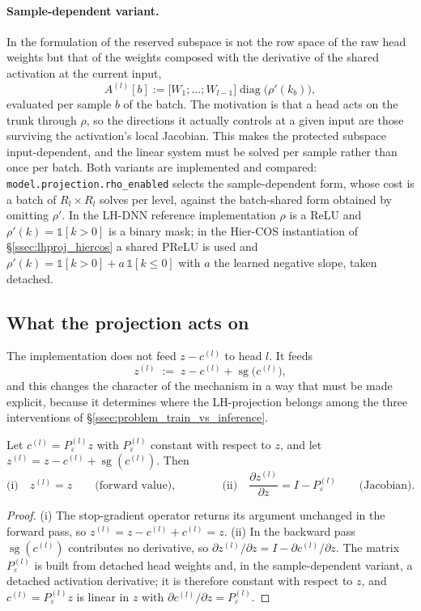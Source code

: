 \paragraph{Sample-dependent variant.} In the formulation of
\cite{fiaschi2024informed} the reserved subspace is not the row space of the raw
head weights but that of the weights composed with the derivative of the shared
activation at the current input,
\[
A^{(l)}[b]:=\big[W_1;\dots;W_{l-1}\big]\operatorname{diag}\!\big(\rho'(k_b)\big),
\]
evaluated per sample $b$ of the batch. The motivation is that a head acts on the
trunk through $\rho$, so the directions it actually controls at a given input are
those surviving the activation's local Jacobian. This makes the protected subspace
input-dependent, and the linear system must be solved per sample rather than once
per batch. Both variants are implemented and compared:
\texttt{model.projection.rho\_enabled} selects the sample-dependent form, whose
cost is a batch of $R_l\times R_l$ solves per level, against the batch-shared form
obtained by omitting $\rho'$. In the LH-DNN reference implementation $\rho$ is a
ReLU and $\rho'(k)=\mathbb{1}[k>0]$ is a binary mask; in the Hier-COS
instantiation of \S\ref{ssec:lhproj_hiercos} a shared PReLU is used and
$\rho'(k)=\mathbb{1}[k>0]+a\,\mathbb{1}[k\le 0]$ with $a$ the learned negative
slope, taken detached.

\subsection{What the projection acts on}
\label{ssec:lhproj_forward}

The implementation does not feed $z-c^{(l)}$ to head $l$. It feeds
\[
z^{(l)} \;:=\; z-c^{(l)}+\operatorname{sg}\big(c^{(l)}\big),
\]
and this changes the character of the mechanism in a way that must be made
explicit, because it determines where the LH-projection belongs among the three
interventions of \S\ref{ssec:problem_train_vs_inference}.

\begin{proposition}
\label{prop:lhproj_forward}
Let $c^{(l)}=P^{(l)}_\varepsilon z$ with $P^{(l)}_\varepsilon$ constant with
respect to $z$, and let
$z^{(l)}=z-c^{(l)}+\operatorname{sg}(c^{(l)})$. Then
\[
\text{(i)}\quad z^{(l)}=z
\qquad\text{(forward value)},
\qquad\qquad
\text{(ii)}\quad
\frac{\partial z^{(l)}}{\partial z}=I-P^{(l)}_\varepsilon
\qquad\text{(Jacobian)} .
\]
\end{proposition}
\begin{proof}
(i) The stop-gradient operator returns its argument unchanged in the forward pass,
so $z^{(l)}=z-c^{(l)}+c^{(l)}=z$. (ii) In the backward pass
$\operatorname{sg}(c^{(l)})$ contributes no derivative, so
$\partial z^{(l)}/\partial z=I-\partial c^{(l)}/\partial z$. The matrix
$P^{(l)}_\varepsilon$ is built from detached head weights and, in the
sample-dependent variant, a detached activation derivative; it is therefore
constant with respect to $z$, and $c^{(l)}=P^{(l)}_\varepsilon z$ is linear in
$z$ with $\partial c^{(l)}/\partial z=P^{(l)}_\varepsilon$.
\end{proof}


